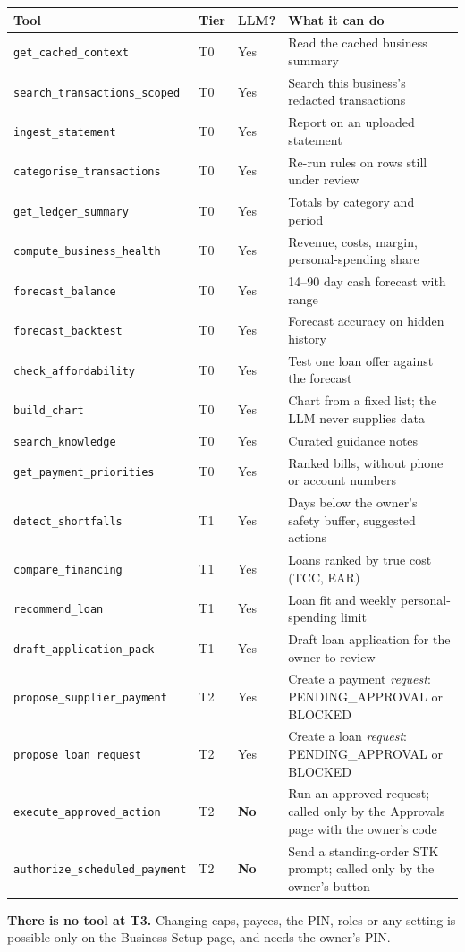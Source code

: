 \documentclass[10pt,a4paper]{article}
\newcommand{\code}[1]{\texttt{\small #1}}
\begin{document}
\begingroup\footnotesize
\begin{longtable}{@{}L{4.6cm}p{0.8cm}p{1.0cm}L{8.0cm}@{}}
\toprule
\textbf{Tool} & \textbf{Tier} & \textbf{LLM?} & \textbf{What it can do}\\
\midrule\endhead
\code{get\_cached\_context} & T0 & Yes & Read the cached business summary\\
\code{search\_transactions\_scoped} & T0 & Yes & Search this business's redacted transactions\\
\code{ingest\_statement} & T0 & Yes & Report on an uploaded statement\\
\code{categorise\_transactions} & T0 & Yes & Re-run rules on rows still under review\\
\code{get\_ledger\_summary} & T0 & Yes & Totals by category and period\\
\code{compute\_business\_health} & T0 & Yes & Revenue, costs, margin, personal-spending share\\
\code{forecast\_balance} & T0 & Yes & 14--90 day cash forecast with range\\
\code{forecast\_backtest} & T0 & Yes & Forecast accuracy on hidden history\\
\code{check\_affordability} & T0 & Yes & Test one loan offer against the forecast\\
\code{build\_chart} & T0 & Yes & Chart from a fixed list; the LLM never supplies data\\
\code{search\_knowledge} & T0 & Yes & Curated guidance notes\\
\code{get\_payment\_priorities} & T0 & Yes & Ranked bills, without phone or account numbers\\
\code{detect\_shortfalls} & T1 & Yes & Days below the owner's safety buffer, suggested actions\\
\code{compare\_financing} & T1 & Yes & Loans ranked by true cost (TCC, EAR)\\
\code{recommend\_loan} & T1 & Yes & Loan fit and weekly personal-spending limit\\
\code{draft\_application\_pack} & T1 & Yes & Draft loan application for the owner to review\\
\code{propose\_supplier\_payment} & T2 & Yes & Create a payment \emph{request}: PENDING\_APPROVAL or BLOCKED\\
\code{propose\_loan\_request} & T2 & Yes & Create a loan \emph{request}: PENDING\_APPROVAL or BLOCKED\\
\code{execute\_approved\_action} & T2 & \textbf{No} & Run an approved request; called only by the Approvals page with the owner's code\\
\code{authorize\_scheduled\_payment} & T2 & \textbf{No} & Send a standing-order STK prompt; called only by the owner's button\\
\bottomrule
\end{longtable}
\endgroup
\textbf{There is no tool at T3.} Changing caps, payees, the PIN, roles or any setting is possible only on the Business Setup page, and needs the owner's PIN.
\end{document}
